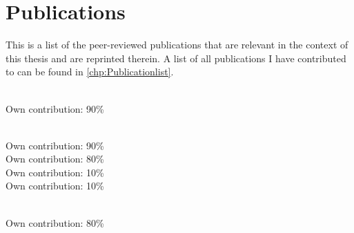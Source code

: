 \noindent
 
\chapter*{Publications}

This is a list of the peer-reviewed publications that are relevant in the context of this thesis and are reprinted therein. A list of all publications I have contributed to can be found in \autoref{chp:Publicationlist}.\\


\noindent{}\\ \strut\hfill Own contribution: 90\%\\

\noindent{}\\ \strut\hfill Own contribution: 90\%\\

\noindent{} \hfill Own contribution: 80\%\\

\noindent{} \hfill Own contribution: 10\%\\

\noindent{} \hfill Own contribution: 10\%\\

\noindent{}\\ \strut\hfill Own contribution: 80\%

